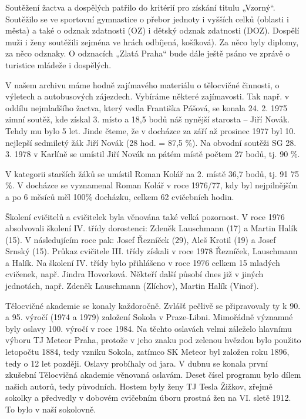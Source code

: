 Soutěžení žactva a dospělých patřilo do kritérií pro získání titulu
„Vzorný``. Soutěžilo se ve sportovní gymnastice o přebor jednoty i
vyšších celků (oblasti i města) a také o odznak zdatnosti (OZ) i dětský
odznak zdatnosti (DOZ). Dospělí muži i ženy soutěžili zejména ve hrách
odbíjená, košíková). Za něco byly diplomy, za něco odznaky. O odznacích
„Zlatá Praha`` bude dále ještě psáno ve zprávě o turistice mládeže i
dospělých.

V našem archivu máme hodně zajímavého materiálu o tělocvičné činnosti, o
výletech a autobusových zájezdech. Vybíráme některé zajímavosti. Tak
např. v oddílu nejmladšího žactva, který vedla Františka Pášová, se
konala 24. 2. 1975 zimní soutěž, kde získal 3. místo a 18,5 bodů náš
nynější starosta -- Jiří Novák. Tehdy mu bylo 5 let. Jinde čteme, že v
docházce za září až prosinec 1977 byl 10. nejlepší sedmiletý žák Jiří
Novák (28 hod. = 87,5 \%). Na obvodní soutěži SG 28. 3. 1978 v Karlíně
se umístil Jiří Novák na pátém místě počtem 27 bodů, tj. 90 \%.

V kategorii starších žáků se umístil Roman Kolář na 2. místě 36,7 bodů,
tj. 91 75 \%. V docházce se vyznamenal Roman Kolář v roce 1976/77, kdy
byl nejpilnějším a po 6 měsíců měl 100\% docházku, celkem 62 cvičebních
hodin.

Školení cvičitelů a cvičitelek byla věnována také velká pozornost. V
roce 1976 absolvovali školení IV. třídy dorostenci: Zdeněk Lauschmann
(17) a Martin Halík (15). V následujícím roce pak: Josef Řezníček (29),
Aleš Krotil (19) a Josef Srnský (15). Průkaz cvičitele III. třídy
získali v roce 1978 Řezníček, Lauschmann a Halík. Na školení IV. třídy
bylo přihlášeno v roce 1976 celkem 15 mladých cvičenek, např. Jindra
Hovorková. Někteří další působí dnes již v jiných jednotách, např.
Zdeněk Lauschmann (Zlíchov), Martin Halík (Vinoř).

Tělocvičné akademie se konaly každoročně. Zvlášť pečlivě se připravovaly
ty k 90. a 95. výročí (1974 a 1979) založení Sokola v Praze-Libni.
Mimořádně významné byly oslavy 100. výročí v roce 1984. Na těchto
oslavách velmi záleželo hlavnímu výboru TJ Meteor Praha, protože v jeho
znaku pod zelenou hvězdou bylo použito letopočtu 1884, tedy vzniku
Sokola, zatímco SK Meteor byl založen roku 1896, tedy o 12 let později.
Oslavy probíhaly od jara. V dubnu se konala první zkušební Tělocvičná
akademie věnovaná oslavám. Deset čísel programu bylo dílem našich
autorů, tedy původních. Hostem byly ženy TJ Tesla Žižkov, zřejmě sokolky
a předvedly v dobovém cvičebním úboru prostná žen na VI. sletě 1912. To
bylo v naší sokolovně.

